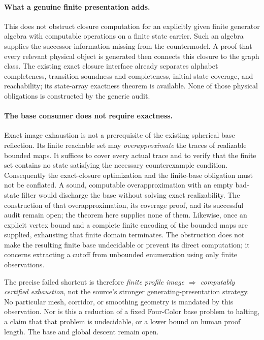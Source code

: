 \paragraph{What a genuine finite presentation adds.}
This does not obstruct closure computation for an explicitly given finite
generator algebra with computable operations on a finite state carrier.
Such an algebra supplies the successor information missing from the
countermodel. A proof that every relevant physical object is generated
then connects this closure to the graph class. The existing exact closure
interface already separates alphabet completeness, transition soundness
and completeness, initial-state coverage, and reachability; its state-array
exactness theorem is available.
None of those physical obligations is constructed by the generic audit.

\paragraph{The base consumer does not require exactness.}
Exact image exhaustion is not a prerequisite of the existing spherical
base reflection. Its finite reachable set may \emph{overapproximate} the
traces of realizable bounded maps. It suffices to cover every actual trace
and to verify that the finite set contains no state satisfying the necessary
counterexample condition.
Consequently the exact-closure optimization and the finite-base obligation
must not be conflated. A sound, computable overapproximation with an empty
bad-state filter would discharge the base without solving exact realizability.
The construction of that overapproximation, its coverage proof, and its
successful audit remain open; the theorem here supplies none of them.
Likewise, once an explicit vertex bound and a complete finite encoding of
the bounded maps are supplied, exhausting that finite domain terminates.
The obstruction does not make the resulting finite base undecidable or
prevent its direct computation; it concerns extracting a cutoff from
unbounded enumeration using only finite observations.

The precise failed shortcut is therefore
\emph{finite profile image $\Rightarrow$ computably certified exhaustion},
not the source's stronger generating-presentation strategy. No particular
mesh, corridor, or smoothing geometry is mandated by this observation.
Nor is this a reduction of a fixed Four-Color base problem to halting, a
claim that that problem is undecidable, or a lower bound on human proof
length. The base and global descent remain open.

